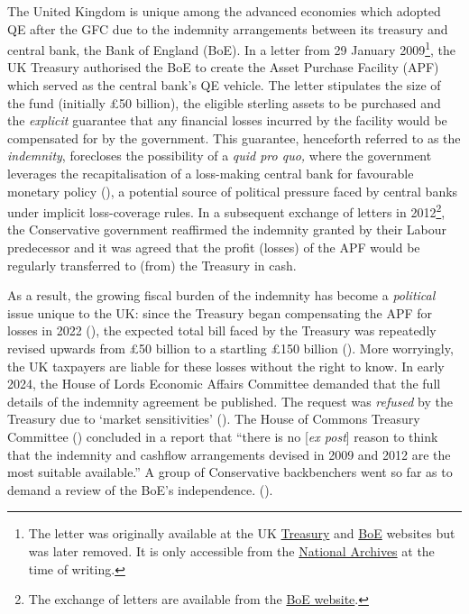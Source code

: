 \documentclass[
  a4paper,
  abstract=true]{scrartcl}
\theoremstyle{definition}
\begin{document}
The United Kingdom is unique among the advanced economies which adopted
QE after the GFC due to the indemnity arrangements between its treasury
and central bank, the Bank of England (BoE). In a letter from 29 January
2009\footnote{The letter was originally available at the UK
  \href{http://www.hm-treasury.gov.uk/d/ck_letter_boe290109.pdf}{Treasury}
  and
  \href{http://www.bankofengland.co.uk/markets/apfgovletter090129.pdf}{BoE}
  websites but was later removed. It is only accessible from the
  \href{https://webarchive.nationalarchives.gov.uk/ukgwa/+/http:/www.hm-treasury.gov.uk/d/ck_letter_boe290109.pdf}{National
  Archives} at the time of writing.}, the UK Treasury authorised the BoE
to create the Asset Purchase Facility (APF) which served as the central
bank's QE vehicle. The letter stipulates the size of the fund (initially
£50 billion), the eligible sterling assets to be purchased and the
\emph{explicit} guarantee that any financial losses incurred by the
facility would be compensated for by the government. This guarantee,
henceforth referred to as the \emph{indemnity}, forecloses the
possibility of a \emph{quid pro quo,} where the government leverages the
recapitalisation of a loss-making central bank for favourable monetary
policy (), a potential source of
political pressure faced by central banks under implicit loss-coverage
rules. In a subsequent exchange of letters in 2012\footnote{The exchange
  of letters are available from the
  \href{https://www.bankofengland.co.uk/letter/2012/apf-excess-letter-november-2012}{BoE
  website}.}, the Conservative government reaffirmed the indemnity
granted by their Labour predecessor and it was agreed that the profit
(losses) of the APF would be regularly transferred to (from) the
Treasury in cash.

As a result, the growing fiscal burden of the indemnity has become a
\emph{political} issue unique to the UK: since the Treasury began
compensating the APF for losses in 2022
(), the expected
total bill faced by the Treasury was repeatedly revised upwards from £50
billion to a startling £150 billion (). More worryingly, the UK taxpayers are liable for these
losses without the right to know. In early 2024, the House of Lords
Economic Affairs Committee demanded that the full details of the
indemnity agreement be published. The request was \emph{refused} by the
Treasury due to `market sensitivities'
(). The House of Commons
Treasury Committee () concluded
in a report that ``there is no {[}\emph{ex post}{]} reason to think that
the indemnity and cashflow arrangements devised in 2009 and 2012 are the
most suitable available.'' A group of Conservative backbenchers went so
far as to demand a review of the BoE's independence.
().
\end{document}
